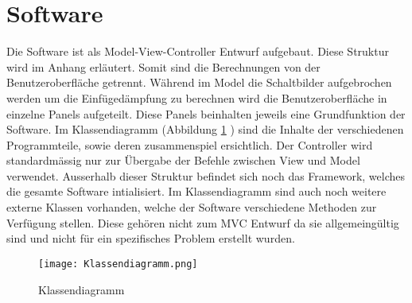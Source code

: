\section{Software} \label{sec:software}

Die Software ist als Model-View-Controller Entwurf aufgebaut. Diese Struktur wird im Anhang erläutert. Somit sind die Berechnungen von der Benutzeroberfläche getrennt. Während im Model die Schaltbilder aufgebrochen werden um die Einfügedämpfung zu berechnen wird die Benutzeroberfläche in einzelne Panels aufgeteilt. Diese Panels beinhalten jeweils eine Grundfunktion der Software. Im Klassendiagramm (Abbildung \ref{fig:klassendiagramm} ) sind die Inhalte der verschiedenen Programmteile, sowie deren zusammenspiel ersichtlich. Der Controller wird standardmässig nur zur Übergabe der Befehle zwischen View und Model verwendet. Ausserhalb dieser Struktur befindet sich noch das Framework, welches die gesamte Software intialisiert. Im Klassendiagramm sind auch noch weitere externe Klassen vorhanden, welche der Software verschiedene Methoden zur Verfügung stellen. Diese gehören nicht zum MVC Entwurf da sie allgemeingültig sind und nicht für ein spezifisches Problem erstellt wurden.


\begin{figure}[H]
		\centering
		\texttt{[image: Klassendiagramm.png]}
		\label{fig:klassendiagramm}
		\caption{Klassendiagramm}
\end{figure}
\newpage







